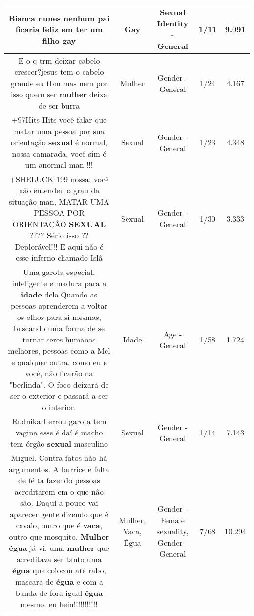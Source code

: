\documentclass[11pt]{article}
\newlength\mylength
\begin{document}
\begin{center}
\begin{longtable}{|C{.65\mylength}|C{.30\mylength}|C{.12\mylength}|C{.12\mylength}|C{.12\mylength}|}
  \small Bianca nunes   nenhum pai ficaria feliz em ter um filho gay\normalsize   & Gay & Sexual Identity - General & 1/11 & 9.091 \\  \hline
  \small E o q trm deixar cabelo crescer?jesus tem o cabelo grande eu tbm mas nem por isso quero ser \textbf{mulher} deixa de ser burra\normalsize   & Mulher & Gender - General & 1/24 & 4.167 \\  \hline
  \small +97Hits Hits você falar que matar uma pessoa por sua orientação \textbf{sexual} é normal, nossa camarada, você sim é um anormal man !!!\normalsize   & Sexual & Gender - General & 1/23 & 4.348 \\  \hline
  \small +SHELUCK 199 nossa, você não entendeu o grau da situação man, MATAR UMA PESSOA POR ORIENTAÇÃO \textbf{SEXUAL} ???? Sério isso ?? Deplorável!!! E aqui não é esse inferno chamado Islã\normalsize   & Sexual & Gender - General & 1/30 & 3.333 \\  \hline
  \small Uma garota especial, inteligente e madura para a \textbf{idade} dela.Quando as pessoas aprenderem a voltar os olhos para si mesmas, buscando uma forma de se tornar seres humanos melhores, pessoas como a Mel e qualquer outra, como eu e você, não ficarão na "berlinda". O foco deixará de ser o exterior e passará a ser o interior.\normalsize   & Idade & Age - General & 1/58 & 1.724 \\  \hline
  \small Rudnikarl errou garota tem vagina esse é daí é macho tem órgão \textbf{sexual} masculino\normalsize   & Sexual & Gender - General & 1/14 & 7.143 \\  \hline
  \small Miguel. Contra fatos não há argumentos. A burrice e falta de fé ta fazendo pessoas acreditarem em o que não são. Daqui a pouco vai aparecer gente dizendo que é cavalo, outro que é \textbf{vaca}, outro que mosquito.  \textbf{Mulher} \textbf{égua} já vi,  uma \textbf{mulher} que acreditava ser tanto uma \textbf{égua} que colocou até rabo, mascara de \textbf{égua} e com a bunda de fora igual \textbf{égua} mesmo. eu hein!!!!!!!!!!!\normalsize   & Mulher, Vaca, Égua & Gender - Female sexuality, Gender - General & 7/68 & 10.294 \\  \hline

\end{longtable}
\end{center}
\end{document}

